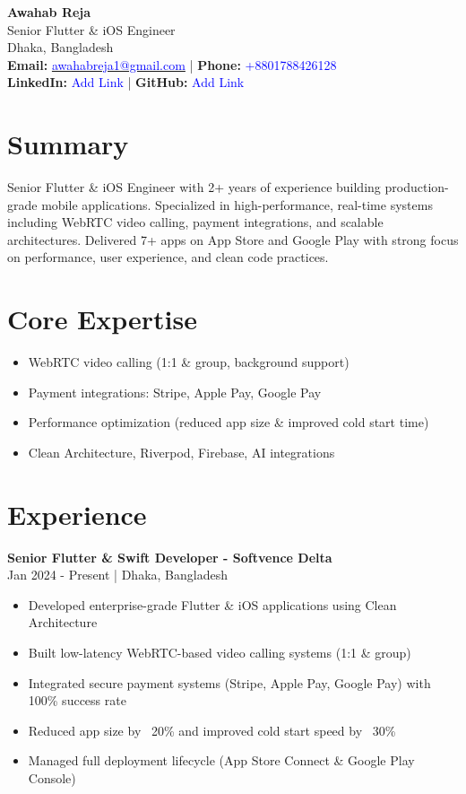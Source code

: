 \documentclass[a4paper,10pt]{article}
\newcommand{\sectionunderline}[1]{\section*{#1}\uline{\hfill}}
\begin{document}
\begin{center}
    {\LARGE \textbf{Awahab Reja}} \\
    {\large Senior Flutter \& iOS Engineer} \\
    Dhaka, Bangladesh \\
    \vspace{0.1cm}
    \textbf{Email:} \href{mailto:awahabreja1@gmail.com}{\textcolor{blue}{awahabreja1@gmail.com}} | 
    \textbf{Phone:} \textcolor{blue}{+8801788426128} \\
    \textbf{LinkedIn:} \textcolor{blue}{Add Link} |
    \textbf{GitHub:} \textcolor{blue}{Add Link}
\end{center}

\sectionunderline{Summary}
Senior Flutter \& iOS Engineer with 2+ years of experience building production-grade mobile applications. 
Specialized in high-performance, real-time systems including WebRTC video calling, payment integrations, 
and scalable architectures. Delivered 7+ apps on App Store and Google Play with strong focus on performance, 
user experience, and clean code practices.

\sectionunderline{Core Expertise}
\begin{itemize}
    \item WebRTC video calling (1:1 \& group, background support)
    \item Payment integrations: Stripe, Apple Pay, Google Pay
    \item Performance optimization (reduced app size \& improved cold start time)
    \item Clean Architecture, Riverpod, Firebase, AI integrations
\end{itemize}

\sectionunderline{Experience}

\textbf{Senior Flutter \& Swift Developer - Softvence Delta} \\
Jan 2024 - Present | Dhaka, Bangladesh
\vspace{-0.2cm}

\begin{itemize} \setlength\itemsep{-0.2em}
    \item Developed enterprise-grade Flutter \& iOS applications using Clean Architecture
    \item Built low-latency WebRTC-based video calling systems (1:1 \& group)
    \item Integrated secure payment systems (Stripe, Apple Pay, Google Pay) with 100\% success rate
    \item Reduced app size by ~20\% and improved cold start speed by ~30\%
    \item Managed full deployment lifecycle (App Store Connect \& Google Play Console)
\end{itemize}
\end{document}

